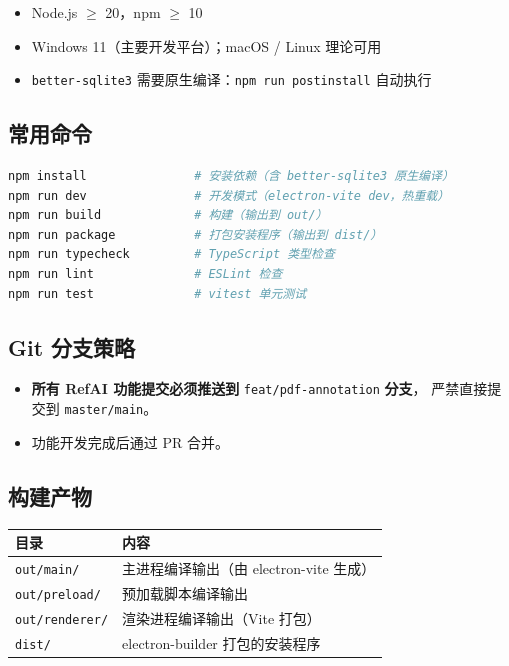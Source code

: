\documentclass[12pt, a4paper]{article}
\begin{document}
\begin{itemize}[leftmargin=2em, itemsep=2pt]
  \item Node.js $\geq$ 20，npm $\geq$ 10
  \item Windows 11（主要开发平台）；macOS / Linux 理论可用
  \item \texttt{better-sqlite3} 需要原生编译：\texttt{npm run postinstall} 自动执行
\end{itemize}

\subsection{常用命令}

\begin{lstlisting}[language=bash, numbers=none]
npm install               # 安装依赖（含 better-sqlite3 原生编译）
npm run dev               # 开发模式（electron-vite dev，热重载）
npm run build             # 构建（输出到 out/）
npm run package           # 打包安装程序（输出到 dist/）
npm run typecheck         # TypeScript 类型检查
npm run lint              # ESLint 检查
npm run test              # vitest 单元测试
\end{lstlisting}

\subsection{Git 分支策略}

\begin{itemize}[leftmargin=2em, itemsep=2pt]
  \item \textbf{所有 RefAI 功能提交必须推送到} \texttt{feat/pdf-annotation} \textbf{分支}，
        严禁直接提交到 \texttt{master/main}。
  \item 功能开发完成后通过 PR 合并。
\end{itemize}

\subsection{构建产物}

\begin{center}
\begin{tabular}{ll}
  \toprule
  \textbf{目录} & \textbf{内容} \\
  \midrule
  \texttt{out/main/}     & 主进程编译输出（由 electron-vite 生成） \\
  \texttt{out/preload/}  & 预加载脚本编译输出 \\
  \texttt{out/renderer/} & 渲染进程编译输出（Vite 打包） \\
  \texttt{dist/}         & electron-builder 打包的安装程序 \\
  \bottomrule
\end{tabular}
\end{center}
\end{document}
